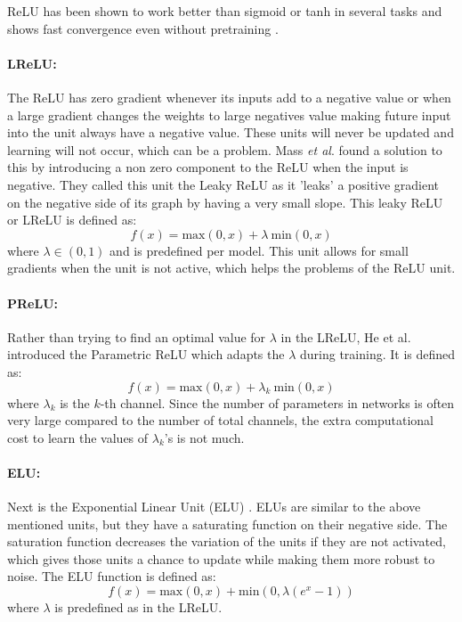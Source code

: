 ReLU has been shown to work better than sigmoid or tanh in several tasks and shows fast convergence even without pretraining \cite{glorot2011deep,krizhevsky2012imagenet,zeiler2013rectified,maas2013rectifier}.

\paragraph{LReLU:}
The ReLU has zero gradient whenever its inputs add to a negative value or when a large gradient changes the weights to large negatives value making future input into the unit always have a negative value. 
These units will never be updated and learning will not occur, which can be a problem. 
Mass \textit{et al}. 
\cite{maas2013rectifier} found a solution to this by introducing a non zero component to the ReLU when the input is negative. 
They called this unit the Leaky ReLU as it 'leaks' a positive gradient on the negative side of its graph by having a very small slope. 
This leaky ReLU or LReLU is defined as:
\begin{equation}
f(x) = \mbox{max}(0,x) + \lambda ~\mbox{min}(0,x)
\label{e:lrelu}
\end{equation}
where $\lambda \in (0,1)$ and is predefined per model. 
This unit allows for small gradients when the unit is not active, which helps the problems of the ReLU unit.

\paragraph{PReLU:}
Rather than trying to find an optimal value for $\lambda$ in the LReLU, He et al. \cite{he2015delving} introduced the Parametric ReLU which adapts the $\lambda$ during training. 
It is defined as:
\begin{equation}
f(x) = \mbox{max}(0,x) + \lambda_k ~\mbox{min}(0,x)
\label{e:prelu}
\end{equation}
where $\lambda_k$ is the $k$-th channel. 
Since the number of parameters in networks is often very large compared to the number of total channels, the extra computational cost to learn the values of $\lambda_k$'s is not much.

\paragraph{ELU:}
Next is the Exponential Linear Unit (ELU) \cite{clevert2015fast}. 
ELUs are similar to the above mentioned units, but they have a saturating function on their negative side. 
The saturation function decreases the variation of the units if they are not activated, which gives those units a chance to update while making them more robust to noise. 
The ELU function is defined as:
\begin{equation}
f(x) = \mbox{max}(0,x) + \mbox{min}(0,\lambda(e^{x}-1))
\label{e:elu}
\end{equation}
where $\lambda$ is predefined as in the LReLU.

